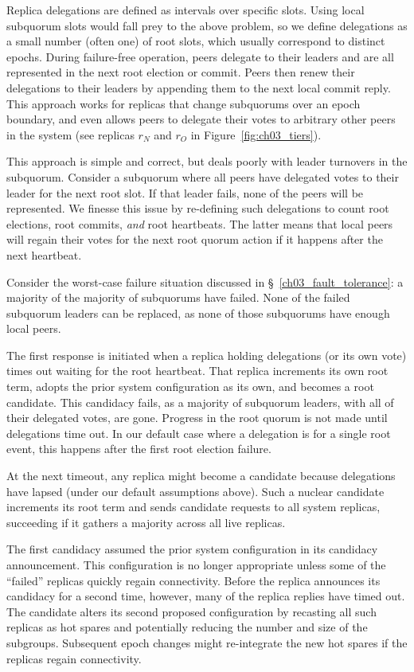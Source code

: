 Replica delegations are defined as intervals over specific slots.
Using local subquorum slots would fall prey to the above problem, so we define delegations as a small number (often one) of root slots, which usually correspond to distinct epochs.
During failure-free operation, peers delegate to their leaders and are all represented in the next root election or commit.
Peers then renew their delegations to their leaders by appending them to the next local commit reply.
This approach works for replicas that change subquorums over an epoch boundary, and even allows peers to delegate their votes to arbitrary other peers in the system (see replicas $r_N$ and $r_O$ in Figure~\ref{fig:ch03_tiers}).

This approach is simple and correct, but deals poorly with leader turnovers in the subquorum.
Consider a subquorum where all peers have delegated votes to their leader for the next root slot.
If that leader fails, none of the peers will be represented.
We finesse this issue by re-defining such delegations to count root elections, root commits, \emph{and} root heartbeats.
The latter means that local peers will regain their votes for the next root quorum action if it happens after the next heartbeat.

Consider the worst-case failure situation discussed in \S~\ref{ch03_fault_tolerance}: a majority of the majority of subquorums have failed.
None of the failed subquorum leaders can be replaced, as none of those subquorums have enough local peers.

The first response is initiated when a replica holding delegations (or its own vote) times out waiting for the root heartbeat.
That replica increments its own root term, adopts the prior system configuration as its own, and becomes a root candidate.
This candidacy fails, as a majority of subquorum leaders, with all of their delegated votes, are gone.
Progress in the root quorum is not made until delegations time out.
In our default case where a delegation is for a single root event, this happens after the first root election failure.

At the next timeout, any replica might become a candidate because delegations have lapsed (under our default assumptions above).
Such a nuclear candidate increments its root term and sends candidate requests to all system replicas, succeeding if it gathers a majority across all live replicas.

The first candidacy assumed the prior system configuration in its candidacy announcement.
This configuration is no longer appropriate unless some of the ``failed'' replicas quickly regain connectivity.
Before the replica announces its candidacy for a second time, however, many of the replica replies have timed out.
The candidate alters its second proposed configuration by recasting all such replicas as hot spares and potentially reducing the number and size of the subgroups.
Subsequent epoch changes might re-integrate the new hot spares if the replicas regain connectivity.

